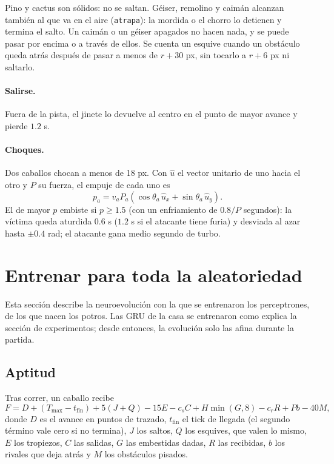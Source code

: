 \documentclass[11pt,letterpaper]{article}
\begin{document}
Pino y cactus son sólidos: no se saltan. Géiser, remolino y caimán alcanzan también al que va en el aire (\texttt{atrapa}): la mordida o el chorro lo detienen y termina el salto. Un caimán o un géiser apagados no hacen nada, y se puede pasar por encima o a través de ellos. Se cuenta un esquive cuando un obstáculo queda atrás después de pasar a menos de $r + 30$ px, sin tocarlo a $r + 6$ px ni saltarlo.

\paragraph{Salirse.} Fuera de la pista, el jinete lo devuelve al centro en el punto de mayor avance y pierde $1.2$ s.

\paragraph{Choques.} Dos caballos chocan a menos de 18 px. Con $\hat u$ el vector unitario de uno hacia el otro y $P$ su fuerza, el empuje de cada uno es
\begin{equation}
p_a = v_a P_a \left(\cos\theta_a\, \hat u_x + \sin\theta_a\, \hat u_y\right).
\end{equation}
El de mayor $p$ embiste si $p \ge 1.5$ (con un enfriamiento de $0.8/P$ segundos): la víctima queda aturdida $0.6$ s ($1.2$ s si el atacante tiene furia) y desviada al azar hasta $\pm 0.4$ rad; el atacante gana medio segundo de turbo.

\section{Entrenar para toda la aleatoriedad}
Esta sección describe la neuroevolución con la que se entrenaron los perceptrones, de los que nacen los potros. Las GRU de la casa se entrenaron como explica la sección de experimentos; desde entonces, la evolución solo las afina durante la partida.
\subsection{Aptitud}
Tras correr, un caballo recibe
\begin{equation}
F = D + (T_{\max} - t_{\text{fin}}) + 5(J + Q) - 15E - c_s C + H\min(G, 8) - c_r R + P b - 40M,
\end{equation}
donde $D$ es el avance en puntos de trazado, $t_{\text{fin}}$ el tick de llegada (el segundo término vale cero si no termina), $J$ los saltos, $Q$ los esquives, que valen lo mismo, $E$ los tropiezos, $C$ las salidas, $G$ las embestidas dadas, $R$ las recibidas, $b$ los rivales que deja atrás y $M$ los obstáculos pisados.
\end{document}
